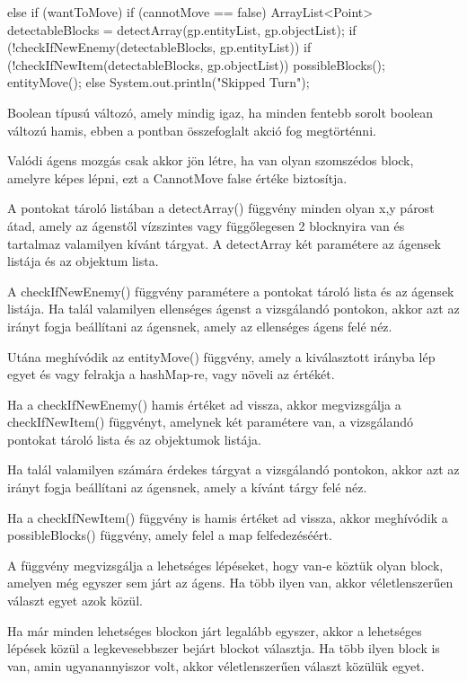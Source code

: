 \begin{java}
else if (wantToMove) {
    if (cannotMove == false) {
        ArrayList<Point> detectableBlocks =
            detectArray(gp.entityList, gp.objectList);
        if (!checkIfNewEnemy(detectableBlocks,
        gp.entityList)) {
            if (!checkIfNewItem(detectableBlocks,
            gp.objectList)) {
                possibleBlocks();
            }
        }
        entityMove();
    } else System.out.println("Skipped Turn");
}
\end{java}

Boolean típusú változó, amely mindig igaz, ha minden fentebb sorolt boolean változú hamis, ebben a pontban összefoglalt akció fog megtörténni.

Valódi ágens mozgás csak akkor jön létre, ha van olyan szomszédos block, amelyre képes lépni, ezt a CannotMove false értéke biztosítja.

A pontokat tároló listában a detectArray() függvény minden olyan x,y párost átad, amely az ágenstől vízszintes vagy függőlegesen 2 blocknyira van
és tartalmaz valamilyen kívánt tárgyat. A detectArray két paramétere az ágensek listája és az objektum lista.

A checkIfNewEnemy() függvény paramétere a pontokat tároló lista és az ágensek listája. Ha talál valamilyen ellenséges ágenst
a vizsgálandó pontokon, akkor azt az irányt fogja beállítani az ágensnek, amely az ellenséges ágens felé néz.

Utána meghívódik az entityMove() függvény, amely a kiválasztott irányba lép egyet és vagy felrakja a hashMap-re, vagy növeli az értékét.

Ha a checkIfNewEnemy() hamis értéket ad vissza, akkor megvizsgálja a checkIfNewItem() függvényt, amelynek két paramétere van, a
vizsgálandó pontokat tároló lista és az objektumok listája.

Ha talál valamilyen számára érdekes tárgyat a vizsgálandó pontokon, akkor azt az irányt fogja beállítani az ágensnek, amely a kívánt tárgy felé néz.

Ha a checkIfNewItem() függvény is hamis értéket ad vissza, akkor meghívódik a possibleBlocks() függvény, amely felel a map felfedezéséért.

A függvény megvizsgálja a lehetséges lépéseket, hogy van-e köztük olyan block, amelyen még egyszer sem járt az ágens. Ha több ilyen van, akkor
véletlenszerűen választ egyet azok közül.

Ha már minden lehetséges blockon járt legalább egyszer, akkor a lehetséges lépések közül a legkevesebbszer bejárt blockot választja. Ha 
több ilyen block is van, amin ugyanannyiszor volt, akkor véletlenszerűen választ közülük egyet.

